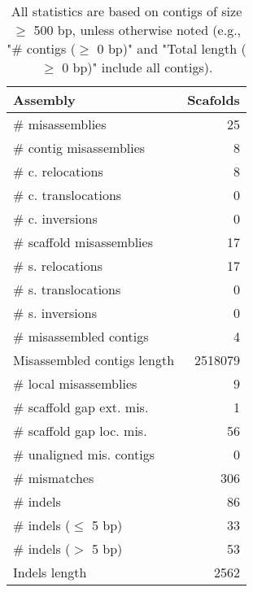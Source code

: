 \documentclass[12pt,a4paper]{article}
\begin{document}
\begin{table}[ht]
\begin{center}
\caption{All statistics are based on contigs of size $\geq$ 500 bp, unless otherwise noted (e.g., "\# contigs ($\geq$ 0 bp)" and "Total length ($\geq$ 0 bp)" include all contigs).}
\begin{tabular}{|l*{1}{|r}|}
\hline
Assembly & Scafolds \\ \hline
\# misassemblies & 25 \\ \hline
\hspace{2mm}\# contig misassemblies & 8 \\ \hline
\hspace{5mm}\# c. relocations & 8 \\ \hline
\hspace{5mm}\# c. translocations & 0 \\ \hline
\hspace{5mm}\# c. inversions & 0 \\ \hline
\hspace{2mm}\# scaffold misassemblies & 17 \\ \hline
\hspace{5mm}\# s. relocations & 17 \\ \hline
\hspace{5mm}\# s. translocations & 0 \\ \hline
\hspace{5mm}\# s. inversions & 0 \\ \hline
\# misassembled contigs & 4 \\ \hline
Misassembled contigs length & 2518079 \\ \hline
\# local misassemblies & 9 \\ \hline
\# scaffold gap ext. mis. & 1 \\ \hline
\# scaffold gap loc. mis. & 56 \\ \hline
\# unaligned mis. contigs & 0 \\ \hline
\# mismatches & 306 \\ \hline
\# indels & 86 \\ \hline
\hspace{5mm}\# indels ($\leq$ 5 bp) & 33 \\ \hline
\hspace{5mm}\# indels ($>$ 5 bp) & 53 \\ \hline
Indels length & 2562 \\ \hline
\end{tabular}
\end{center}
\end{table}
\end{document}
